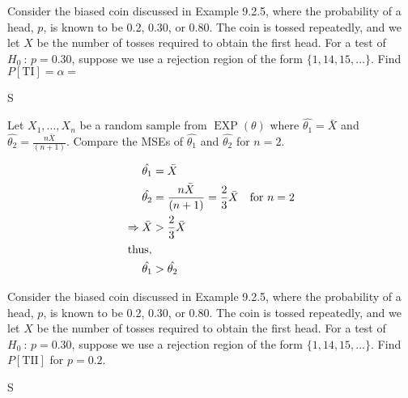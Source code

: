\documentclass[answers]{exam}
\begin{document}
\begin{questions}
\question 
Consider the biased coin discussed in Example 9.2.5, where the probability of a head, 
\(p\), is known to be 0.2, 0.30, or 0.80. 
The coin is tossed repeatedly, 
and we let \(X\) be the number of tosses required to obtain the first head. 
For a test of \(H_0\ :\,p=0.30\), suppose we use a rejection region of the form
\(\{1,14,15,\ldots\}\). Find \(P\left[\text{TI}\right]=\alpha=\)
\begin{solution}
	S
	
\end{solution}

\question 
Let \(X_1,\ldots,X_n\) be a random sample from \(\operatorname{EXP}(\theta)\) where \(\hat{\theta_1}=\bar{X}\) and \(\hat{\theta_2}=\frac{n\bar{X}}{(n+1)}\). 
Compare the MSEs of \(\hat{\theta_1}\) and \(\hat{\theta_2}\) for \(n=2\).
\begin{solution}
	\begin{align}
		\hat{\theta_1} &= \bar{X} \\
		\hat{\theta_2} & = \frac{n\bar{X}}{(n+1)} 
		= \frac{2}{3}\bar{X} \quad \text{for } n=2 \\
		\Rightarrow \bar{X} &> \frac{2}{3}\bar{X} \\
		\intertext{thus,}
		\hat{\theta_1} &> \hat{\theta_2}
	\end{align}
	
	
\end{solution}

\question 
Consider the biased coin discussed in Example 9.2.5, where the probability of a
head, \(p\), is known to be 0.2, 0.30, or 0.80. 
The coin is tossed repeatedly, and we let \(X\) be the number of tosses 
required to obtain the first head. For a test of \(H_0\ :\,p=0.30\), 
suppose we use a rejection region of the form \(\{1,14,15,\ldots\}\). 
Find \(P\left[\text{TII}\right]\) for \(p=0.2\).
\begin{solution}
	S
	
\end{solution}

\end{questions}
\end{document}
